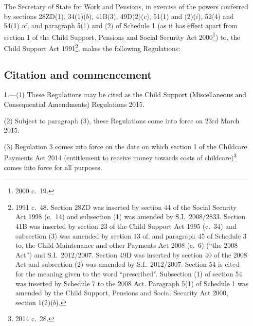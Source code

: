 \documentclass[12pt,a4paper]{article}
\title{\regstitle}
\author{S.I.\ 2015 No.\ 338}
\date{Made
19th February 2015\\
Laid before Parliament
26th February 2015\\
Coming into force
in accordance with regulation 1
}
\begin{document}
\maketitle


\noindent
The Secretary of State for Work and Pensions, in exercise of the powers conferred by sections 28ZD(1), 34(1)($b$), 41B(3), 49D(2)($c$), 51(1) and (2)($i$), 52(4) and 54(1) of, and paragraph 5(1) and (2) of Schedule 1 (as it has effect apart from section 1 of the Child Support, Pensions and Social Security Act 2000\footnote{2000 c.~19.}) to, the Child Support Act 1991\footnote{1991 c.~48. Section 28ZD was inserted by section 44 of the Social Security Act 1998 (c.~14) and subsection (1) was amended by S.I.~2008/2833. Section 41B was inserted by section 23 of the Child Support Act 1995 (c.~34) and subsection (3) was amended by section 13 of, and paragraph 45 of Schedule 3 to, the Child Maintenance and other Payments Act 2008 (c.~6) (“the 2008 Act”) and S.I.~2012/2007. Section 49D was inserted by section 40 of the 2008 Act and subsection (2) was amended by S.I.~2012/2007. Section 54 is cited for the meaning given to the word “prescribed”. Subsection (1) of section 54 was inserted by Schedule 7 to the 2008 Act. Paragraph 5(1) of Schedule 1 was amended by the Child Support, Pensions and Social Security Act 2000, section 1(2)($b$).}, makes the following Regulations: 

{\sloppy

\tableofcontents

}

\bigskip

\setcounter{secnumdepth}{-2}

\subsection[1. Citation and commencement]{Citation and commencement}

1.—(1) These Regulations may be cited as the Child Support (Miscellaneous and Consequential Amendments) Regulations 2015.

(2) Subject to paragraph (3), these Regulations come into force on 23rd March 2015.

(3) Regulation 3 comes into force on the date on which section 1 of the Childcare Payments Act 2014 (entitlement to receive money towards costs of childcare)\footnote{2014 c.~28.} comes into force for all purposes.
\end{document}

